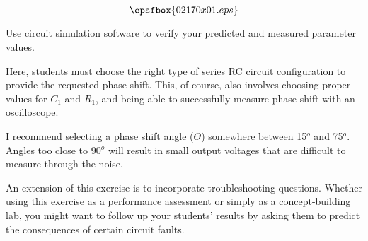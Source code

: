 

$$\epsfbox{02170x01.eps}$$

\vfil \eject






Use circuit simulation software to verify your predicted and measured parameter values.







Here, students must choose the right type of series RC circuit configuration to provide the requested phase shift.  This, of course, also involves choosing proper values for $C_1$ and $R_1$, and being able to successfully measure phase shift with an oscilloscope.

I recommend selecting a phase shift angle ($\Theta$) somewhere between 15$^{o}$ and 75$^{o}$.  Angles too close to 90$^{o}$ will result in small output voltages that are difficult to measure through the noise.

An extension of this exercise is to incorporate troubleshooting questions.  Whether using this exercise as a performance assessment or simply as a concept-building lab, you might want to follow up your students' results by asking them to predict the consequences of certain circuit faults.




